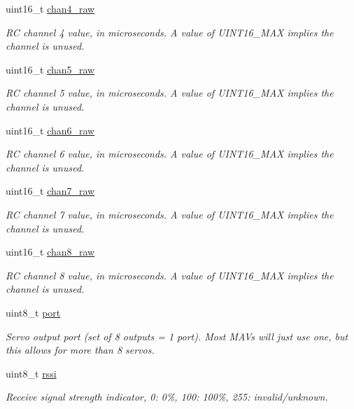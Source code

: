 \begin{DoxyCompactItemize}
uint16\+\_\+t \hyperlink{struct____mavlink__rc__channels__raw__t_a5c7b02424976def78bae64edb08b4c60}{chan4\+\_\+raw}
\begin{DoxyCompactList}\small\item\em R\+C channel 4 value, in microseconds. A value of U\+I\+N\+T16\+\_\+\+M\+A\+X implies the channel is unused. \end{DoxyCompactList}\item 
uint16\+\_\+t \hyperlink{struct____mavlink__rc__channels__raw__t_add8ae2761f8b65c92d0d2cc4f2e836fd}{chan5\+\_\+raw}
\begin{DoxyCompactList}\small\item\em R\+C channel 5 value, in microseconds. A value of U\+I\+N\+T16\+\_\+\+M\+A\+X implies the channel is unused. \end{DoxyCompactList}\item 
uint16\+\_\+t \hyperlink{struct____mavlink__rc__channels__raw__t_a4f2114cbf6637d9b0c661f08d54c9958}{chan6\+\_\+raw}
\begin{DoxyCompactList}\small\item\em R\+C channel 6 value, in microseconds. A value of U\+I\+N\+T16\+\_\+\+M\+A\+X implies the channel is unused. \end{DoxyCompactList}\item 
uint16\+\_\+t \hyperlink{struct____mavlink__rc__channels__raw__t_a6cccd33a0b2b888a3671e66e0c88d799}{chan7\+\_\+raw}
\begin{DoxyCompactList}\small\item\em R\+C channel 7 value, in microseconds. A value of U\+I\+N\+T16\+\_\+\+M\+A\+X implies the channel is unused. \end{DoxyCompactList}\item 
uint16\+\_\+t \hyperlink{struct____mavlink__rc__channels__raw__t_ac4181e5b2c297dbe24431a4ca1d1493e}{chan8\+\_\+raw}
\begin{DoxyCompactList}\small\item\em R\+C channel 8 value, in microseconds. A value of U\+I\+N\+T16\+\_\+\+M\+A\+X implies the channel is unused. \end{DoxyCompactList}\item 
uint8\+\_\+t \hyperlink{struct____mavlink__rc__channels__raw__t_a3d166207003ffe9bfc68b3461ae1f03c}{port}
\begin{DoxyCompactList}\small\item\em Servo output port (set of 8 outputs = 1 port). Most M\+A\+Vs will just use one, but this allows for more than 8 servos. \end{DoxyCompactList}\item 
uint8\+\_\+t \hyperlink{struct____mavlink__rc__channels__raw__t_a23cda9263105190c2278e2bb1264a886}{rssi}
\begin{DoxyCompactList}\small\item\em Receive signal strength indicator, 0\+: 0\%, 100\+: 100\%, 255\+: invalid/unknown. \end{DoxyCompactList}\end{DoxyCompactItemize}


